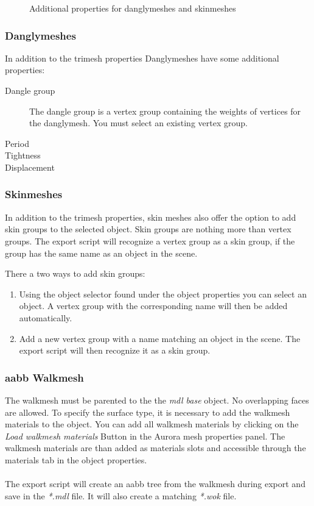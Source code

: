 \documentclass[a4paper]{article}
\begin{document}
\begin{figure}%
  \centering
{}\qquad
{}
\caption[Additional Porperties]{Additional properties for danglymeshes and skinmeshes}%
  \label{fig:addprops}%
\end{figure}

\subsubsection{Danglymeshes}
In addition to the trimesh properties Danglymeshes have some additional properties:
\begin{description}
    \item[Dangle group] The dangle group is a vertex group containing the weights of vertices for the danglymesh. You must select an existing vertex group.
    \item[Period] 
    \item[Tightness]
    \item[Displacement] 
\end{description}

\subsubsection{Skinmeshes}
In addition to the trimesh properties, skin meshes also offer the option to add skin groups to the selected object. Skin groups are nothing more than vertex groups. The export script will recognize a vertex group as a skin group, if the group has the same name as an object in the scene.

There a two ways to add skin groups:
\begin{enumerate}
  \item Using the object selector found under the object properties you can select an object. A vertex group with the corresponding name will then be added automatically.
  \item Add a new vertex group with a name matching an object in the scene. The export script will then recognize it as a skin group.
\end{enumerate}

\subsubsection{aabb Walkmesh}
The walkmesh must be parented to the the {\itshape{mdl base}} object. No overlapping faces are allowed. To specify the surface type, it is necessary to add the walkmesh materials to the object. You can add all walkmesh materials by clicking on the {\itshape{Load walkmesh materials}} Button in the Aurora mesh properties panel. The walkmesh materials are than added as materials slots and accessible through the materials tab in the object properties. \\ \\
The export script will create an aabb tree from the walkmesh during export and save in the {\itshape{*.mdl}} file. It will also create a matching {\itshape{*.wok}} file.
\end{document}
